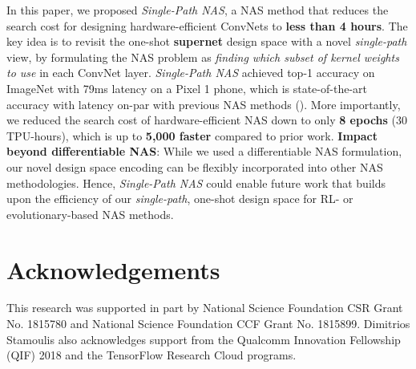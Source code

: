 \documentclass[runningheads]{llncs}
\begin{document}
In this paper, we proposed \textit{Single-Path NAS}, a NAS method
that reduces the search cost for designing hardware-efficient ConvNets 
to \textbf{less than 4 hours}. The key idea is to revisit the 
one-shot \textbf{supernet} design space with a novel
\textit{single-path} view, by formulating the NAS problem as 
\textit{finding which subset of kernel weights
to use} in each ConvNet layer. \textit{Single-Path NAS} achieved 
 top-1 accuracy on ImageNet with 79ms latency on a Pixel 1 
phone, which is state-of-the-art accuracy with latency on-par 
with previous NAS methods (). More importantly, 
we reduced the search cost of hardware-efficient NAS down 
to only \textbf{8 epochs} (30 TPU-hours), which is up to 
\textbf{5,000 faster} compared to prior work. 
\textbf{Impact beyond differentiable NAS}: 
While we used a differentiable NAS formulation, our novel design 
space encoding can be flexibly incorporated into other NAS methodologies. 
Hence, \textit{Single-Path NAS} could enable future work that 
builds upon the efficiency of our \textit{single-path}, one-shot 
design space for RL- or evolutionary-based NAS methods. 


\section*{Acknowledgements}
This research was supported in part by National Science Foundation CSR 
Grant No. 1815780 and National Science Foundation CCF Grant No. 1815899. 
Dimitrios Stamoulis also acknowledges support from the Qualcomm Innovation 
Fellowship (QIF) 2018 and the TensorFlow Research Cloud programs.





\end{document}
